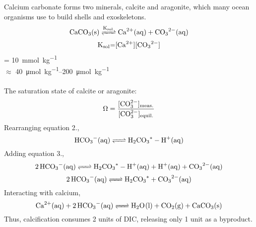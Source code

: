 Calcium carbonate forms two minerals, calcite and aragonite, which many ocean organisms use to build shells and exoskeletons.
\[\ce{CaCO3(s) <=>[K_{sol}] Ca^2+(aq) + CO3^2-(aq)}\]
\[\ce{K_{sol}=[Ca^2+][CO3^2-]}\]
\ce{[Ca^2+]} = \qty{10}{\mmol\per\kg}
\\\ce{[CO3^2-]} $\approx$ \qtyrange[range-units = single]{40}{200}{\umol\per\kg}
\\~\\The saturation state of calcite or aragonite:
\begin{equation}
    \Omega = \ce{\dfrac{[CO_3^{2-}]_{meas.}}{[CO_3^{2-}]_{equil.}}}
\end{equation}
Rearranging equation 2.,
\[\ce{HCO3-(aq) <=> H2CO3^* - H+(aq)}\]
Adding equation 3.,
\[\ce{2HCO3-(aq) <=> H2CO3^* - H+(aq) + H+(aq) + CO3^2-(aq)}\]
\[\ce{2HCO3-(aq) <=> H2CO3^* + CO3^2-(aq)}\]
Interacting with calcium,
\[\ce{Ca^2+(aq) + 2HCO3-(aq) <=> H2O(l) + CO2(g) + CaCO3(s)}\]
Thus, calcification consumes 2 units of DIC, releasing only 1 unit as a byproduct.